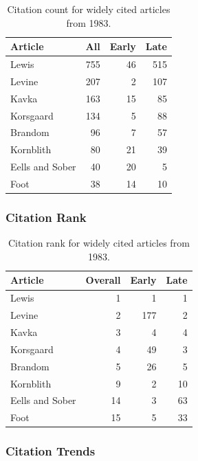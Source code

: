 \documentclass[
  10pt,
  letterpaper,
  DIV=11,
  numbers=noendperiod,
  twoside]{scrartcl}
\begin{document}
\begin{longtable}[]{@{}lrrr@{}}

\caption{\label{tbl-citation-count-1983}Citation count for widely cited
articles from 1983.}

\tabularnewline

\toprule\noalign{}
Article & All & Early & Late \\
\midrule\noalign{}
\endhead
\bottomrule\noalign{}
\endlastfoot
Lewis & 755 & 46 & 515 \\
Levine & 207 & 2 & 107 \\
Kavka & 163 & 15 & 85 \\
Korsgaard & 134 & 5 & 88 \\
Brandom & 96 & 7 & 57 \\
Kornblith & 80 & 21 & 39 \\
Eells and Sober & 40 & 20 & 5 \\
Foot & 38 & 14 & 10 \\

\end{longtable}

\subsubsection*{Citation Rank}\label{sec-rank-1983}

\begin{longtable}[]{@{}lrrr@{}}

\caption{\label{tbl-citation-rank-1983}Citation rank for widely cited
articles from 1983.}

\tabularnewline

\toprule\noalign{}
Article & Overall & Early & Late \\
\midrule\noalign{}
\endhead
\bottomrule\noalign{}
\endlastfoot
Lewis & 1 & 1 & 1 \\
Levine & 2 & 177 & 2 \\
Kavka & 3 & 4 & 4 \\
Korsgaard & 4 & 49 & 3 \\
Brandom & 5 & 26 & 5 \\
Kornblith & 9 & 2 & 10 \\
Eells and Sober & 14 & 3 & 63 \\
Foot & 15 & 5 & 33 \\

\end{longtable}

\subsubsection*{Citation Trends}\label{sec-trends-1983}
\end{document}
